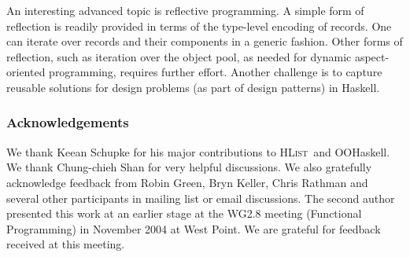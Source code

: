 \documentclass{jfp}
\newcommand{\HList}{\textsc{HList}}
\begin{document}
An interesting advanced topic is reflective programming. A simple form
of reflection is readily provided in terms of the type-level encoding
of records. One can iterate over records and their components in a
generic fashion. Other forms of reflection, such as iteration over the
object pool, as needed for dynamic aspect-oriented programming,
requires further effort. Another challenge is to capture reusable
solutions for design problems (as part of design patterns) in Haskell.

    




{\small 

\subsubsection*{Acknowledgements}
 
We thank Keean Schupke for his major contributions to \HList\ and
OOHaskell. We thank Chung-chieh Shan for very helpful discussions.  We
also gratefully acknowledge feedback from Robin Green, Bryn Keller,
Chris Rathman and several other participants in mailing list or email
discussions. The second author presented this work at an earlier stage
at the WG2.8 meeting (Functional Programming) in November 2004 at West
Point. We are grateful for feedback received at this meeting.

}




{\small




}


\end{document}
